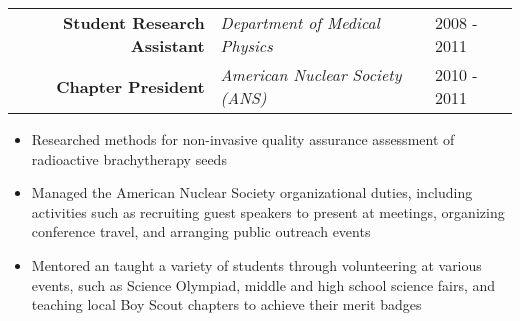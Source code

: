 \begin{minipage}{\textwidth}
\begin{itemize}
	\end{itemize}
\end{minipage}


\begin{minipage}{\textwidth}
	\begin{center}
		\begin{tabular}{rll}
			\textbf{Student Research Assistant} & \textit{Department of Medical Physics} & 2008 - 2011 \\
			\textbf{Chapter President} & \textit{American Nuclear Society (ANS)} & 2010 - 2011 \\
		\end{tabular}
	\end{center}
\end{minipage}

\begin{minipage}{\textwidth}
	\begin{itemize}
		\item Researched methods for non-invasive quality assurance assessment of radioactive brachytherapy seeds
		\item Managed the American Nuclear Society organizational duties, including activities such as recruiting guest speakers to present at meetings,
			organizing conference travel, and arranging public outreach events
		\item Mentored an taught a variety of students through volunteering at various events, such as Science Olympiad, middle and 
			high school science fairs, and teaching local Boy Scout chapters to achieve their merit badges
	\end{itemize}
\end{minipage}
